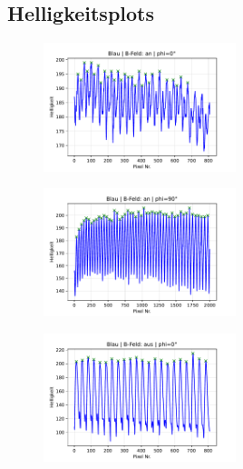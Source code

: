 \subsection{Helligkeitsplots}
\label{sec:plots}
\twocolumn[]
      
      \newpage
      \begin{figure}
        \centering
        \includegraphics[width=0.5\textwidth]{content/grafiken/blau mit magnet 0 gimbplot.pdf}
        \caption{}
        \label{fig:bmm0}
      \end{figure}
      
      \begin{figure}
        \centering
        \includegraphics[width=0.5\textwidth]{content/grafiken/blau mit magnet 90 gimbplot.pdf}
        \caption{}
        \label{fig:bmm90}
      \end{figure}
      
      \begin{figure}
        \centering
        \includegraphics[width=0.5\textwidth]{content/grafiken/blau ohne magnet 0 gimbplot.pdf}
        \caption{}
        \label{fig:bom0}
      \end{figure}
      
